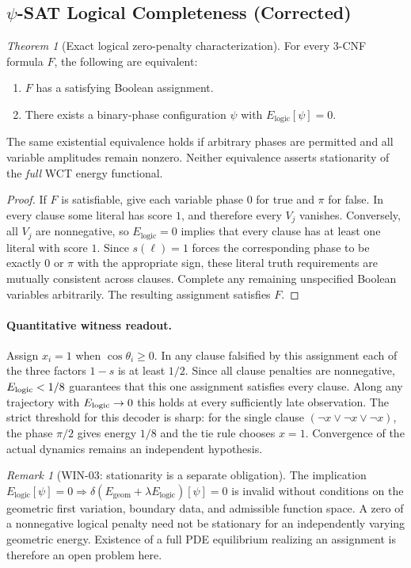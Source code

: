 \documentclass[12pt]{article}
\theoremstyle{remark}
\newtheorem*{remark}{Remark}
\newtheorem{theorem}{Theorem}[section]
\begin{document}
\subsection{$\psi$-SAT Logical Completeness (Corrected)}
\begin{theorem}[Exact logical zero-penalty characterization]
\label{thm:psi-sat-completeness}
For every $3$-CNF formula $F$, the following are equivalent:
\begin{enumerate}
\item $F$ has a satisfying Boolean assignment.
\item There exists a binary-phase configuration $\psi$ with
$E_{\mathrm{logic}}[\psi]=0$.
\end{enumerate}
The same existential equivalence holds if arbitrary phases are permitted
and all variable amplitudes remain nonzero. Neither equivalence asserts
stationarity of the \emph{full} WCT energy functional.
\end{theorem}
\begin{proof}
If $F$ is satisfiable, give each variable phase $0$ for true and
$\pi$ for false. In every clause some literal has score $1$, and
therefore every $V_j$ vanishes. Conversely, all $V_j$ are
nonnegative, so $E_{\mathrm{logic}}=0$ implies that every clause has
at least one literal with score $1$. Since $s(\ell)=1$ forces the
corresponding phase to be exactly $0$ or $\pi$ with the appropriate
sign, these literal truth requirements are mutually consistent across
clauses. Complete any remaining unspecified Boolean variables
arbitrarily. The resulting assignment satisfies $F$.
\end{proof}

\paragraph{Quantitative witness readout.}
Assign $x_i=1$ when $\cos\theta_i\ge0$. In any clause falsified by this
assignment each of the three factors $1-s$ is at least $1/2$. Since all
clause penalties are nonnegative, $E_{\rm logic}<1/8$ guarantees that
this one assignment satisfies every clause. Along any trajectory with
$E_{\rm logic}\to0$ this holds at every sufficiently late observation.
The strict threshold for this decoder is sharp: for the single clause
$(\neg x\vee\neg x\vee\neg x)$, the phase $\pi/2$ gives energy $1/8$
and the tie rule chooses $x=1$. Convergence of the actual dynamics
remains an independent hypothesis.

\begin{remark}[WIN-03: stationarity is a separate obligation]
The implication $E_{\mathrm{logic}}[\psi]=0\Rightarrow
\delta(E_{\mathrm{geom}}+\lambda E_{\mathrm{logic}})[\psi]=0$
is invalid without conditions on the geometric first variation,
boundary data, and admissible function space. A zero of a nonnegative
logical penalty need not be stationary for an independently varying
geometric energy. Existence of a full PDE equilibrium realizing an
assignment is therefore an open problem here.
\end{remark}
\end{document}
